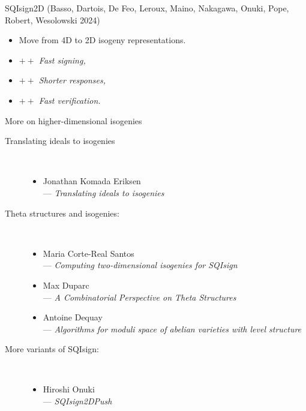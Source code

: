 \documentclass[aspectratio=169]{beamer}
\begin{document}

\begin{frame}{SQIsign2D {\footnotesize(Basso, Dartois, De Feo, Leroux, Maino, Nakagawa, Onuki, Pope, Robert, Wesolowski 2024)}}
  \begin{itemize}
    \setlength{\itemsep}{2em}
  \item Move from 4D to 2D isogeny representations.
  \item \emph{$++$ Fast signing,}
  \item \emph{$++$ Shorter responses,}
  \item \emph{$++$ Fast verification.}
  \end{itemize}
\end{frame}


\begin{frame}{More on higher-dimensional isogenies}
  \begin{description}
  \item[Translating ideals to isogenies]\
    \begin{itemize}
    \item Jonathan Komada Eriksen\\
      --- \textit{Translating ideals to isogenies}
    \end{itemize}
  \item[Theta structures and isogenies:]\
    \begin{itemize}
    \item Maria Corte-Real Santos\\
      --- \textit{Computing two-dimensional isogenies for SQIsign}
    \item Max Duparc\\
      --- \textit{A Combinatorial Perspective on Theta Structures}
    \item Antoine Dequay\\
      --- \textit{Algorithms for moduli space of abelian varieties with level structure}
    \end{itemize}
  \item[More variants of SQIsign:]\
    \begin{itemize}
    \item Hiroshi Onuki\\
      --- \textit{SQIsign2DPush}
    \end{itemize}
  \end{description}
\end{frame}

\end{document}
